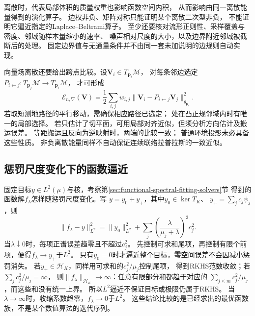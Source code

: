离散时，代表局部体积的质量权重也影响函数空间内积，
从而影响由同一离散能量得到的演化算子。
边权非负、矩阵对称只能证明某个离散二次型非负，
不能证明它逼近指定的Laplace--Beltrami算子。
至少还要核对流形正则性、采样覆盖与密度、邻域随样本量缩小的速率、
噪声相对尺度的大小，以及边界附近邻域被截断后的处理。
固定边界值与无通量条件并不由同一套未加说明的边规则自动实现。

向量场离散还要给出跨点比较。设$\bm V_i\in T_{\bm p_i}\mathcal M$，
对每条邻边选定$P_{i\leftarrow j}:T_{\bm p_j}\mathcal M\to T_{\bm p_i}\mathcal M$，
才可形成
\[
 \mathcal E_{n,\nabla}(\bm V)
 =\frac12\sum_{i,j}w_{i,j}
      \lVert\bm V_i-P_{i\leftarrow j}\bm V_j\rVert_{g_{\bm p_i}}^2.
\]
若取短测地路径的平行移动，需确保相应路径已选定；
处在凸正规邻域内时有唯一的局部选择。
若只估计了切平面，可用局部对齐近似，但须分析方向估计及搬运误差。
等距搬运且反向为逆映射时，两端的比较一致；
普通环境投影未必具备这些性质。
非负离散能量同样不自动保证连续联络拉普拉斯的一致近似。

\subsection{惩罚尺度变化下的函数逼近}
\label{sec:functional-penalty-scale-approximation}

固定目标$y\in L^2(\mu)$与核，考察第\ref{sec:functional-spectral-fitting-solvers}节
得到的函数解$f_\lambda$怎样随惩罚尺度变化。写
$y=y_0+y_+$，其中$y_0\in\ker T_K$、
$y_+=\sum_jc_j\psi_j$，则
\[
 \lVert f_\lambda-y\rVert_{L^2}^2
 =\lVert y_0\rVert_{L^2}^2+
   \sum_j\left(\frac{\lambda}{\mu_j+\lambda}\right)^2c_j^2.
\]
当$\lambda\downarrow0$时，每项正谱误差趋零且不超过$c_j^2$。
先控制可求和尾项，再控制有限个前项，便得$f_\lambda\to y_+$于$L^2$。
只有$y_0=0$时才逼近整个目标，零空间误差不会因减小惩罚消失。
若$y_+\in\mathcal H_K$，同样用可求和的$c_j^2/\mu_j$控制尾项，
得到RKHS范数收敛；若$\sum_jc_j^2/\mu_j=\infty$，
则$\lVert f_\lambda\rVert_{\mathcal H_K}\to\infty$：任意有限部分和都趋于对应的
$\sum_{j\leq m}c_j^2/\mu_j$，而这些和没有统一上界。
所以$L^2$逼近不保证目标或极限仍属于RKHS。
当$\lambda\to\infty$时，收缩系数趋零，$f_\lambda\to0$于$L^2$。
这些结论比较的是已经求出的最优函数族，不是某个数值算法的迭代序列。

